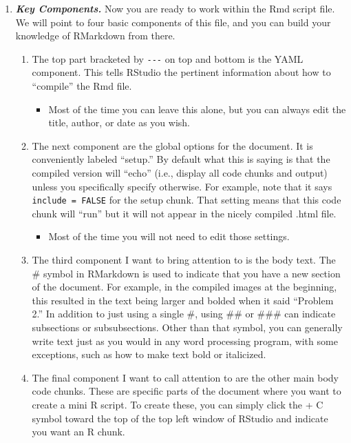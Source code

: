 \documentclass[
  letterpaper,
  DIV=11,
  numbers=noendperiod]{scrreprt}
\providecommand{\tightlist}{%
  \setlength{\itemsep}{0pt}\setlength{\parskip}{0pt}}\usepackage{longtable,booktabs,array}
\begin{document}
\begin{enumerate}
\def\labelenumi{\arabic{enumi}.}
\setcounter{enumi}{4}
\item
  \textbf{\emph{Key Components.}} Now you are ready to work within the
  Rmd script file. We will point to four basic components of this file,
  and you can build your knowledge of RMarkdown from there.

  \begin{enumerate}
  \def\labelenumii{\arabic{enumii}.}
  \tightlist
  \item
    The top part bracketed by \texttt{-\/-\/-} on top and bottom is the
    YAML component. This tells RStudio the pertinent information about
    how to ``compile'' the Rmd file.

    \begin{itemize}
    \tightlist
    \item
      Most of the time you can leave this alone, but you can always edit
      the title, author, or date as you wish.
    \end{itemize}
  \item
    The next component are the global options for the document. It is
    conveniently labeled ``setup.'' By default what this is saying is
    that the compiled version will ``echo'' (i.e., display all code
    chunks and output) unless you specifically specify otherwise. For
    example, note that it says \texttt{include\ =\ FALSE} for the setup
    chunk. That setting means that this code chunk will ``run'' but it
    will not appear in the nicely compiled .html file.

    \begin{itemize}
    \tightlist
    \item
      Most of the time you will not need to edit those settings.
    \end{itemize}
  \item
    The third component I want to bring attention to is the body text.
    The \# symbol in RMarkdown is used to indicate that you have a new
    section of the document. For example, in the compiled images at the
    beginning, this resulted in the text being larger and bolded when it
    said ``Problem 2.'' In addition to just using a single \#, using
    \#\# or \#\#\# can indicate subsections or subsubsections. Other
    than that symbol, you can generally write text just as you would in
    any word processing program, with some exceptions, such as how to
    make text bold or italicized.
  \item
    The final component I want to call attention to are the other main
    body code chunks. These are specific parts of the document where you
    want to create a mini R script. To create these, you can simply
    click the + C symbol toward the top of the top left window of
    RStudio and indicate you want an R chunk.
  \end{enumerate}


\end{enumerate}
\end{document}
